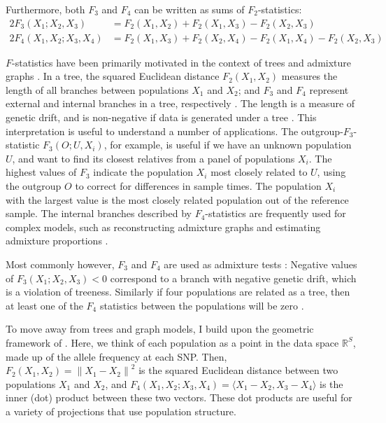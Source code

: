 \documentclass[12pt,fullpage, a4paper]{article}
\newcommand{\normsq}[1]{\left\lVert#1\right\rVert^2}
\begin{document}
 Furthermore, both $F_3$ and $F_4$ can be written as sums of $F_2$-statistics:
\begin{subequations}
	\begin{align}
2F_3(X_1; X_2, X_3) &=  F_2(X_1, X_2) + F_2(X_1, X_3) - F_2(X_2, X_3)\label{eq:f3fromf2}\\
2F_4(X_1, X_2; X_3, X_4) &= F_2(X_1, X_3) + F_2(X_2, X_4) - F_2(X_1,X_4) - F_2(X_2, X_3)\label{eq:f4fromf2}
	\end{align}
\end{subequations}

$F$-statistics have been primarily motivated in the context of trees and admixture graphs \citep{patterson2012}. In a tree, the squared Euclidean distance $F_2(X_1, X_2)$ measures the length of all branches between populations $X_1$ and $X_2$; and $F_3$ and $F_4$ represent external and internal branches in a tree, respectively \citep{peter2016}. The length is a measure of genetic drift, and is non-negative if data is generated under a tree \citep{patterson2012}. This interpretation is useful to understand a number of applications. The outgroup-$F_3$-statistic $F_3(O; U, X_i)$, for example, is useful if we have an unknown population $U$, and want to find its closest relatives from a panel of populations $X_i$. The highest values of $F_3$ indicate the population $X_i$ most closely related to $U$, using the outgroup $O$ to correct for differences in sample times. The population $X_i$ with the largest value is the most closely related population out of the reference sample. The internal branches described by  $F_4$-statistics are frequently used for complex models, such as  reconstructing admixture graphs \citep{patterson2012, lipson2013} and estimating admixture proportions \citep{petr2019, harney2021}.

Most commonly however, $F_3$ and $F_4$ are used as admixture tests \citep{patterson2012}: Negative values of  $F_3(X_1; X_2, X_3) < 0$ correspond to a branch with negative genetic drift, which is a violation of treeness. Similarly if four populations are related as a tree, then at least one of the $F_4$ statistics between the populations will be zero \citep{patterson2012}.

To move away from trees and graph models, I build upon the geometric framework of \cite{oteo-garcia2021}. Here, we think of each population as a point in the data space $\mathbb{R}^S$, made up of the allele frequency at each SNP. Then, $F_2(X_1, X_2) = \normsq{X_1 - X_2}$ is the squared Euclidean distance between two populations $X_1$ and $X_2$, and $F_4(X_1, X_2 ; X_3, X_4) = \langle X_1 - X_2, X_3 - X_4 \rangle$ is the inner (dot) product between these two vectors. These dot products are useful for a variety of projections that use population structure.
\end{document}
